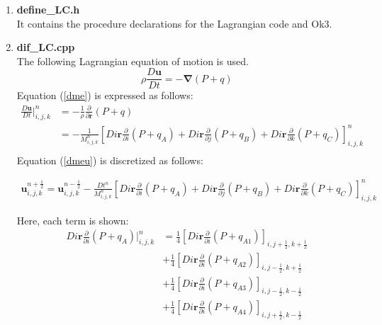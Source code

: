 \begin{enumerate}
	
\item {\bf define\_LC.h}\\
It contains the procedure declarations for the Lagrangian code and Ok3. 

\item {\bf dif\_LC.cpp}\\
The following Lagrangian equation of motion is used.
\begin{equation}\label{dme}
		\rho\frac{D\bm u}{Dt}=-{\bm\nabla}(P+q)
	\end{equation}
Equation (\ref {dme}) is expressed as follows: 
	\begin{equation}
\begin{split}\label{dmeu}
\frac{D\bm u}{Dt}\bigg|^n_{i,j,k}&
=-\frac{1}{\rho}\frac{\partial}{\partial \bm r} (P+q)\\&
=-\frac{1}{M^n_{i,j,k}}\left[Di\bm r\frac{\partial}{\partial i}(P+q_A)+Di\bm r\frac{\partial}{\partial j}(P+q_B)+Di\bm r\frac{\partial}{\partial k}(P+q_C)\right]^n_{i,j,k}\\&
\end{split}
\end{equation}
Equation (\ref{dmeu}) is discretized as follows: 

\small
	\begin{eqnarray}
		\bm u^{n+\frac{1}{2}}_{i,j,k}=\bm u^{n-\frac{1}{2}}_{i,j,k} - \frac{Dt^n}{M^n_{i,j,k}}\left[Di\bm r\frac{\partial}{\partial i}(P+q_A)+Di\bm r\frac{\partial}{\partial j}(P+q_B)+Di\bm r\frac{\partial}{\partial k}(P+q_C)\right]^n_{i,j,k}
		\label{dmeu2}
	\end{eqnarray}
\normalsize

Here, each term is shown: 
\begin{equation}
\begin{split}
Di\bm r\frac{\partial}{\partial i}(P+q_A)\bigg|^n_{i,j,k}&=
\frac{1}{4}\left[Di\bm r\frac{\partial}{\partial i}(P+q_{A1})\right]_{i,j+\frac{1}{2},k+\frac{1}{2}}\\&
+\frac{1}{4}\left[Di\bm r\frac{\partial}{\partial i}(P+q_{A2})\right]_{i,j-\frac{1}{2},k+\frac{1}{2}}\\&
+\frac{1}{4}\left[Di\bm r\frac{\partial}{\partial i}(P+q_{A3})\right]_{i,j-\frac{1}{2},k-\frac{1}{2}}\\&
+\frac{1}{4}\left[Di\bm r\frac{\partial}{\partial i}(P+q_{A4})\right]_{i,j+\frac{1}{2},k-\frac{1}{2}}\\
\end{split}
\end{equation}


\end{enumerate}
